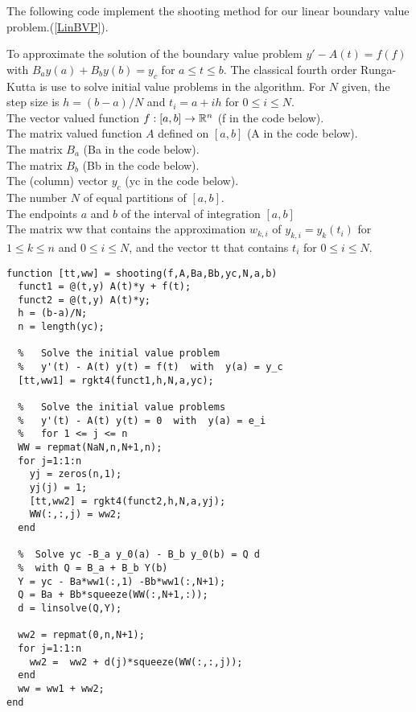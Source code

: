 The following code implement the shooting method for our linear
boundary value problem.(\ref{LinBVP}).

\begin{code}
To approximate the solution of the boundary value problem
$y' - A(t) = f(f)$ with $B_a y(a) + B_b y(b) = y_c$  for $a \leq t \leq b$.
The classical fourth order Runga-Kutta is use to solve initial value
problems in the algorithm.  For $N$ given, the step size is $h = (b-a)/N$ and
$t_i = a + i h $ for  $0 \leq i \leq N$.\\
 The vector valued function $f:[a,b] \to \mathbb{R}^n$ (f in the
code below).\\
The \nn matrix valued function $A$ defined on $[a,b]$ (A in the code below).\\
The \nn matrix $B_a$ (Ba in the code below).\\
The \nn matrix $B_b$ (Bb in the code below).\\
The (column) vector $y_c$ (yc in the code below).\\
The number $N$ of equal partitions of $[a,b]$.\\
The endpoints $a$ and $b$ of the interval of integration $[a,b]$ \\
 The  matrix ww that contains the
approximation $w_{k,i}$ of $y_{k,i} = y_k(t_i)$ for $1 \leq k \leq n$
and $0 \leq i \leq N$, and the vector tt that contains
$t_i$ for $0 \leq i \leq N$.
\small
\begin{verbatim}
function [tt,ww] = shooting(f,A,Ba,Bb,yc,N,a,b)
  funct1 = @(t,y) A(t)*y + f(t);
  funct2 = @(t,y) A(t)*y; 
  h = (b-a)/N;
  n = length(yc);

  %   Solve the initial value problem
  %   y'(t) - A(t) y(t) = f(t)  with  y(a) = y_c
  [tt,ww1] = rgkt4(funct1,h,N,a,yc);

  %   Solve the initial value problems
  %   y'(t) - A(t) y(t) = 0  with  y(a) = e_i
  %   for 1 <= j <= n
  WW = repmat(NaN,n,N+1,n);
  for j=1:1:n
    yj = zeros(n,1);
    yj(j) = 1;
    [tt,ww2] = rgkt4(funct2,h,N,a,yj);
    WW(:,:,j) = ww2;
  end

  %  Solve yc -B_a y_0(a) - B_b y_0(b) = Q d
  %  with Q = B_a + B_b Y(b)
  Y = yc - Ba*ww1(:,1) -Bb*ww1(:,N+1);
  Q = Ba + Bb*squeeze(WW(:,N+1,:));
  d = linsolve(Q,Y);

  ww2 = repmat(0,n,N+1);
  for j=1:1:n
    ww2 =  ww2 + d(j)*squeeze(WW(:,:,j));
  end
  ww = ww1 + ww2;
end
\end{verbatim}
\end{code}

